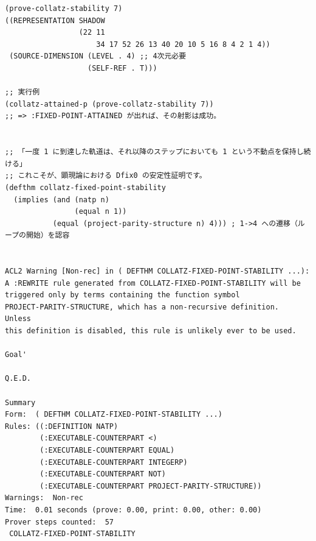 \documentclass[11pt,a4paper]{article}
\theoremstyle{definition}
\begin{document}
\begin{lstlisting}[caption={四次元観測による射影結果}]
(prove-collatz-stability 7)
((REPRESENTATION SHADOW
                 (22 11
                     34 17 52 26 13 40 20 10 5 16 8 4 2 1 4))
 (SOURCE-DIMENSION (LEVEL . 4) ;; 4次元必要
                   (SELF-REF . T)))

;; 実行例
(collatz-attained-p (prove-collatz-stability 7))
;; => :FIXED-POINT-ATTAINED が出れば、その射影は成功。


;; 「一度 1 に到達した軌道は、それ以降のステップにおいても 1 という不動点を保持し続ける」
;; これこそが、顕現論における Dfix0 の安定性証明です。
(defthm collatz-fixed-point-stability
  (implies (and (natp n)
                (equal n 1))
           (equal (project-parity-structure n) 4))) ; 1->4 への遷移（ループの開始）を認容


ACL2 Warning [Non-rec] in ( DEFTHM COLLATZ-FIXED-POINT-STABILITY ...):
A :REWRITE rule generated from COLLATZ-FIXED-POINT-STABILITY will be
triggered only by terms containing the function symbol 
PROJECT-PARITY-STRUCTURE, which has a non-recursive definition.  Unless
this definition is disabled, this rule is unlikely ever to be used.

Goal'

Q.E.D.

Summary
Form:  ( DEFTHM COLLATZ-FIXED-POINT-STABILITY ...)
Rules: ((:DEFINITION NATP)
        (:EXECUTABLE-COUNTERPART <)
        (:EXECUTABLE-COUNTERPART EQUAL)
        (:EXECUTABLE-COUNTERPART INTEGERP)
        (:EXECUTABLE-COUNTERPART NOT)
        (:EXECUTABLE-COUNTERPART PROJECT-PARITY-STRUCTURE))
Warnings:  Non-rec
Time:  0.01 seconds (prove: 0.00, print: 0.00, other: 0.00)
Prover steps counted:  57
 COLLATZ-FIXED-POINT-STABILITY
\end{lstlisting}
\end{document}
